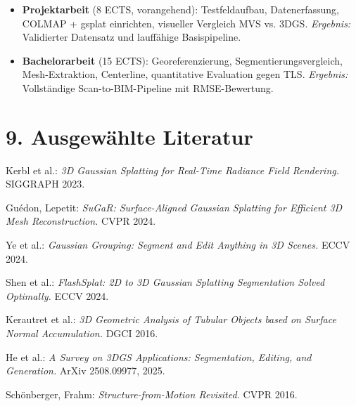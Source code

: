 \documentclass[11pt, a4paper]{article}
\begin{document}
\begin{itemize}[noitemsep, leftmargin=1.5em]
    \item \textbf{Projektarbeit} (8 ECTS, vorangehend): Testfeldaufbau, Datenerfassung, COLMAP + gsplat einrichten, visueller Vergleich MVS vs. 3DGS. \textit{Ergebnis:} Validierter Datensatz und lauff\"ahige Basispipeline.
    \item \textbf{Bachelorarbeit} (15 ECTS): Georeferenzierung, Segmentierungsvergleich, Mesh-Extraktion, Centerline, quantitative Evaluation gegen TLS. \textit{Ergebnis:} Vollst\"andige Scan-to-BIM-Pipeline mit RMSE-Bewertung.
\end{itemize}

\section{9. Ausgew\"ahlte Literatur}

\begin{enumerate}[noitemsep, leftmargin=1.5em, label={[\arabic*]}]
    \item Kerbl et al.: \textit{3D Gaussian Splatting for Real-Time Radiance Field Rendering.} SIGGRAPH 2023.
    \item Gu\'edon, Lepetit: \textit{SuGaR: Surface-Aligned Gaussian Splatting for Efficient 3D Mesh Reconstruction.} CVPR 2024.
    \item Ye et al.: \textit{Gaussian Grouping: Segment and Edit Anything in 3D Scenes.} ECCV 2024.
    \item Shen et al.: \textit{FlashSplat: 2D to 3D Gaussian Splatting Segmentation Solved Optimally.} ECCV 2024.
    \item Kerautret et al.: \textit{3D Geometric Analysis of Tubular Objects based on Surface Normal Accumulation.} DGCI 2016.
    \item He et al.: \textit{A Survey on 3DGS Applications: Segmentation, Editing, and Generation.} ArXiv 2508.09977, 2025.
    \item Sch\"onberger, Frahm: \textit{Structure-from-Motion Revisited.} CVPR 2016.
\end{enumerate}
\end{document}
